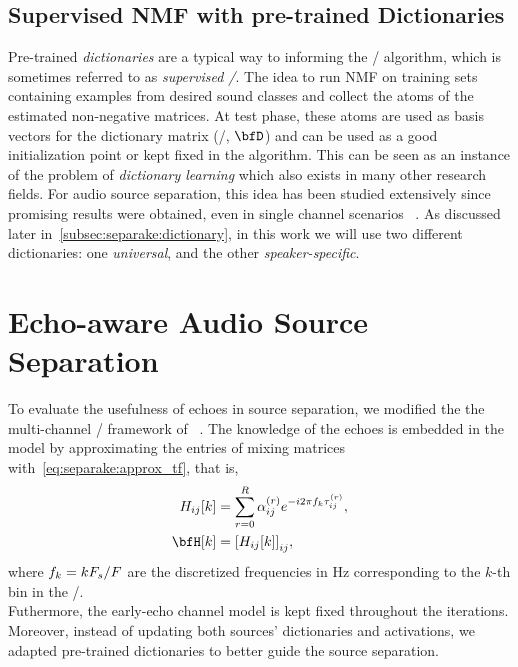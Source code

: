 \subsection{Supervised NMF with pre-trained Dictionaries}
Pre-trained \textit{dictionaries} are a typical way to informing the \NMF/ algorithm, which is sometimes referred to as \textit{supervised \NMF/}.
The idea to run NMF on training sets containing examples from desired sound classes and collect the atoms of the estimated non-negative matrices.
At test phase, these atoms are used as basis vectors for the dictionary matrix (\ie/, $\mD$) and can be used as a good initialization point or kept fixed in the algorithm.
This can be seen as an instance of the problem of \textit{dictionary learning} which also exists in many other research fields.
For audio source separation, this idea has been studied extensively since promising results were obtained, even in single channel scenarios ~.
As discussed later in~\cref{subsec:separake:dictionary}, in this work we will use two different dictionaries: one \textit{universal}, and the other \textit{speaker-specific}.


\section{Echo-aware Audio Source Separation}
To evaluate the usefulness of echoes in source separation, we modified the the multi-channel \NMF/ framework of \citeauthor{ozerov2010multichannel}~.
The knowledge of the echoes is embedded in the model by approximating the entries of mixing matrices with~\eqref{eq:separake:approx_tf}, that is,
\begin{equation}
    \begin{aligned}
        \FLT_{\idxMicSrc}[k] &= \sum_{\idxEch=0}^{\numEchs} \alpha_{\idxMicSrc}^{(\idxEch)} \cste^{-\csti 2 \pi f_k \tau_{\idxMicSrc}^{(\idxEch)}},\\
        \FLTSS[k] &= \kbracket{\FLT_{\idxMicSrc}[k]}_{\idxMicSrc},
    \end{aligned}
\end{equation}
where $f_k = kF_s/F$ are the discretized frequencies in Hz corresponding to the $k$-th bin in the \DFT/.
\\Futhermore, the early-echo channel model is kept fixed throughout the iterations.
Moreover, instead of updating both sources' dictionaries and activations, we adapted pre-trained dictionaries to better guide the source separation.


